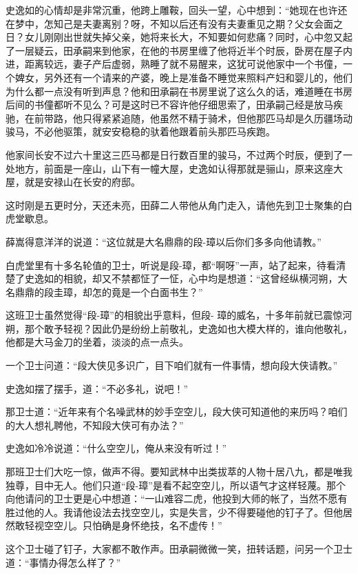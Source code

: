 \documentclass[12pt,oneside]{book}
\begin{document}
史逸如的心情却是非常沉重，他跨上雕鞍，回头一望，心中想到：``她现在也许还在梦中，怎知己是夫妻离别？呀，不知以后还有没有夫妻重见之期？父女会面之日？女儿刚刚出世就失掉父亲，她将来长大，不知要如何悲痛？同时，心中忽又起了一层疑云，田承嗣来到他家，在他的书房里缠了他将近半个时辰，卧房在屋子内进，距离较远，妻子产后虚弱，熟睡了就不易醒来，这犹可说他家中一个书僮，一个婢女，另外还有一个请来的产婆，晚上是准备不睡觉来照料产妇和婴儿的，他们为什么都一点没有听到声息？他和田承嗣在书房里说了这么久的话，难道睡在书房后间的书僮都听不见么？可是这时已不容许他仔细思索了，田承嗣己经是放马疾驰，在前带路，他只得紧紧追随，他虽然不精于骑术，但他那匹马却是久历疆场动骏马，不必他驱策，就安安稳稳的驮着他跟着前头那匹马疾跑。

他家间长安不过六十里这三匹马都是日行数百里的骏马，不过两个时辰，便到了一处地方，前面是一座山，山下有一幢大屋，史逸如认得那就是骊山，原来这座大屋，就是安禄山在长安的府邸。

这时刚是五更时分，天还未亮，田薛二人带他从角门走入，请他先到卫士聚集的白虎堂歇息。

薛嵩得意洋洋的说道：``这位就是大名鼎鼎的段-璋以后你们多多向他请教。''

白虎堂里有十多名轮值的卫士，听说是段-璋，都``啊呀''一声，站了起来，待看清楚了史逸如的相貌，却又不禁都怔了一怔，心中均是想道：``这曾经纵横河朔，大名鼎鼎的段圭璋，却怎的竟是一个白面书生？''

这班卫士虽然觉得``段-璋''的相貌出乎意料，但段-
璋的威名，十多年前就已震惊河朔，那个敢予轻视？因此仍是纷纷上前敬礼，史逸如也大模大样的，谁向他敬礼，他都是大马金刀的坐着，淡淡的点一点头。

一个卫士问道：``段大侠见多识广，目下咱们就有一件事情，想向段大侠请教。''

史逸如摆了摆手，道：``不必多礼，说吧！''

那卫士道：``近年来有个名噪武林的妙手空空儿，段大侠可知道他的来历吗？咱们的大人想礼聘他，不知段大侠可有办法？''

史逸如冷冷说道：``什么空空儿，俺从来没有听过！''

那班卫士们大吃一惊，做声不得。要知武林中出类拔萃的人物十居八九，都是唯我独尊，目中无人。他们只道``段-璋''是看不起空空儿，所以语气才这样轻蔑。那个向他请问的卫士更是心中想道：``一山难容二虎，他投到大师的帐了，当然不愿有胜过他的人。我请他设法去找空空儿，实是失言，少不得要碰他的钉子了。但他居然敢轻视空空儿。只怕确是身怀绝技，名不虚传！''

这个卫士碰了钉子，大家都不敢作声。田承嗣微微一笑，扭转话题，问另一个卫士道：``事情办得怎么样了？''
\end{document}
